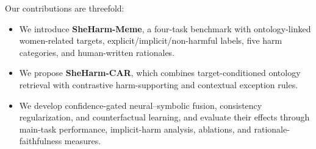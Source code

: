 \documentclass[11pt]{article}
\begin{document}
Our contributions are threefold:
\begin{itemize}
\setlength{\itemsep}{1pt}
\setlength{\parskip}{0pt}
\setlength{\parsep}{0pt}

\item We introduce \textbf{SheHarm-Meme}, a four-task benchmark with
ontology-linked women-related targets, explicit/implicit/non-harmful
labels, five harm categories, and human-written rationales.

\item We propose \textbf{SheHarm-CAR}, which combines
target-conditioned ontology retrieval with contrastive
harm-supporting and contextual exception rules.

\item We develop confidence-gated neural--symbolic fusion,
consistency regularization, and counterfactual learning, and evaluate
their effects through main-task performance, implicit-harm analysis,
ablations, and rationale-faithfulness measures.
\end{itemize}






\end{document}
